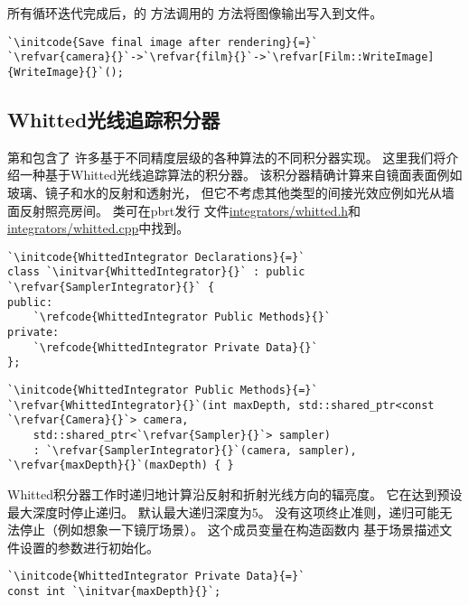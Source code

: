 所有循环迭代完成后，的
方法调用的
方法将图像输出写入到文件。
\begin{lstlisting}
`\initcode{Save final image after rendering}{=}`
`\refvar{camera}{}`->`\refvar{film}{}`->`\refvar[Film::WriteImage]{WriteImage}{}`();
\end{lstlisting}

\subsection{Whitted光线追踪积分器}\label{sub:Whitted光线追踪积分器}
第和包含了
许多基于不同精度层级的各种算法的不同积分器实现。
这里我们将介绍一种基于Whitted光线追踪算法的积分器。
该积分器精确计算来自镜面表面例如玻璃、镜子和水的反射和透射光，
但它不考虑其他类型的间接光效应例如光从墙面反射照亮房间。
类可在pbrt发行
文件\href{https://github.com/mmp/pbrt-v3/tree/master/src/integrators/whitted.h}{\ttfamily integrators/whitted.h}和
\href{https://github.com/mmp/pbrt-v3/tree/master/src/integrators/whitted.cpp}{\ttfamily integrators/whitted.cpp}中找到。
\begin{lstlisting}
`\initcode{WhittedIntegrator Declarations}{=}`
class `\initvar{WhittedIntegrator}{}` : public `\refvar{SamplerIntegrator}{}` {
public:
    `\refcode{WhittedIntegrator Public Methods}{}`
private:
    `\refcode{WhittedIntegrator Private Data}{}`
};
\end{lstlisting}
\begin{lstlisting}
`\initcode{WhittedIntegrator Public Methods}{=}`
`\refvar{WhittedIntegrator}{}`(int maxDepth, std::shared_ptr<const `\refvar{Camera}{}`> camera,
    std::shared_ptr<`\refvar{Sampler}{}`> sampler)
    : `\refvar{SamplerIntegrator}{}`(camera, sampler), `\refvar{maxDepth}{}`(maxDepth) { }
\end{lstlisting}

Whitted积分器工作时递归地计算沿反射和折射光线方向的辐亮度。
它在达到预设最大深度时停止递归。
默认最大递归深度为5。
没有这项终止准则，递归可能无法停止（例如想象一下镜厅场景）。
这个成员变量在构造函数内
基于场景描述文件设置的参数进行初始化。
\begin{lstlisting}
`\initcode{WhittedIntegrator Private Data}{=}`
const int `\initvar{maxDepth}{}`;
\end{lstlisting}

